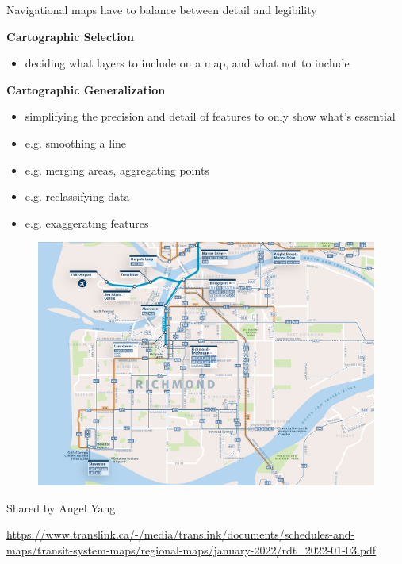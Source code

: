 \documentclass[aspectratio=169]{beamer}
\begin{document}
%	
%	
%	
%	





\begin{frame}
	
	Navigational maps have to balance between detail and legibility
	
	\vspace{6mm}
	
	\textbf{Cartographic Selection}
	
	\begin{itemize}
		\item deciding what layers to include on a map, and what not to include
	\end{itemize}
	
	 \textbf{Cartographic Generalization}
	\begin{itemize}
		\item simplifying the precision and detail of features to only show what's essential
		\item e.g. smoothing a line
		\item e.g. merging areas, aggregating points
		\item e.g. reclassifying data
		\item e.g. exaggerating features
	\end{itemize}
	
\end{frame}




\begin{frame}
	
	\begin{figure}
		\centering
		\includegraphics[width=0.8\linewidth]{images/richmond.png}
	\end{figure}
	
	\tiny Shared by Angel Yang 
	
	\tiny \url{https://www.translink.ca/-/media/translink/documents/schedules-and-maps/transit-system-maps/regional-maps/january-2022/rdt_2022-01-03.pdf}
	
\end{frame}
\end{document}
